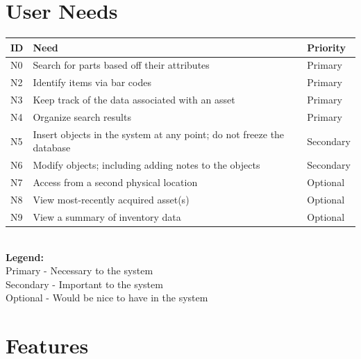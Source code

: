 \documentclass{article}
\begin{document}
\section{User Needs}
\begin{tabular}{ | p{0.15in} | p{4.0in} | p{.75in} |}
\hline
\textbf{ID} & \textbf{Need} & \textbf{Priority} \\
\hline
\hline
N0 & Search for parts based off their attributes & Primary \\
\hline
N2 & Identify items via bar codes & Primary \\
\hline
N3 & Keep track of the data associated with an asset & Primary \\
\hline
N4 & Organize search results & Primary \\
\hline
N5 & Insert objects in the system at any point; do not freeze the database & Secondary \\
\hline
N6 & Modify objects; including adding notes to the objects & Secondary \\
\hline
N7 & Access from a second physical location & Optional \\
\hline
N8 & View most-recently acquired asset(s) & Optional \\
\hline
N9 & View a summary of inventory data & Optional \\
\hline
\end{tabular} \\
\textbf{Legend:} \\
Primary - Necessary to the system \\
Secondary - Important to the system \\
Optional - Would be nice to have in the system \\

\section{Features}
\end{document}
